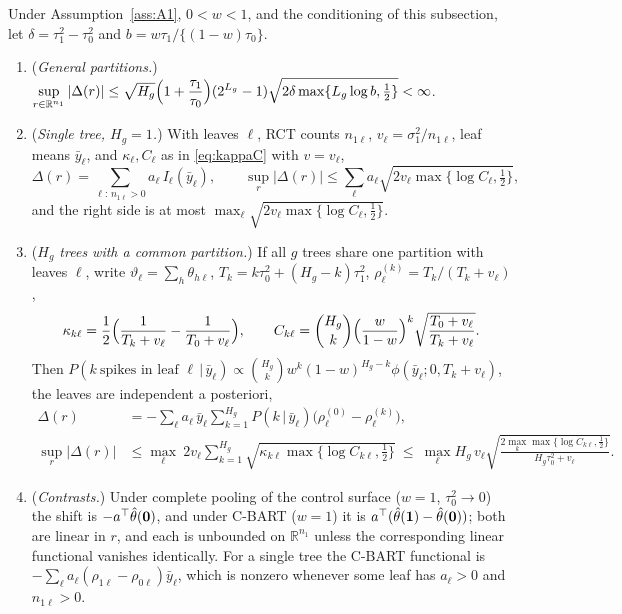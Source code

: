\documentclass[11pt]{article}
\newcommand{\given}{\,\vert\,}
\theoremstyle{definition}
\theoremstyle{plain}
\begin{document}
{\begin{corA}\label{cor:estimand}
Under Assumption~\ref{ass:A1}, $0<w<1$, and the conditioning of this subsection, let $\delta=\tau_1^2-\tau_0^2$ and $b=w\tau_1/\{(1-w)\tau_0\}$.
\begin{enumerate}[label=(\alph*),leftmargin=2.2em]
\item (\emph{General partitions.}) $\displaystyle\sup_{r\in\mathbb R^{n_1}}|\Delta(r)|\le \sqrt{H_g}\Bigl(1+\frac{\tau_1}{\tau_0}\Bigr)(2^{L_g}-1)\sqrt{2\delta\max\{L_g\log b,\tfrac12\}}<\infty$.
\item (\emph{Single tree, $H_g=1$.}) With leaves $\ell$, RCT counts $n_{1\ell}$, $v_\ell=\sigma_1^2/n_{1\ell}$, leaf means $\bar y_\ell$, and $\kappa_\ell,C_\ell$ as in \eqref{eq:kappaC} with $v=v_\ell$,
\[
\Delta(r)=\sum_{\ell:\,n_{1\ell}>0}a_\ell\,I_\ell(\bar y_\ell),\qquad
\sup_r|\Delta(r)|\le\sum_\ell a_\ell\sqrt{2v_\ell\max\{\log C_\ell,\tfrac12\}} ,
\]
and the right side is at most $\max_\ell\sqrt{2v_\ell\max\{\log C_\ell,\tfrac12\}}$.
\item (\emph{$H_g$ trees with a common partition.}) If all $g$ trees share one partition with leaves $\ell$, write $\vartheta_\ell=\sum_h\theta_{h\ell}$, $T_k=k\tau_0^2+(H_g-k)\tau_1^2$, $\rho^{(k)}_\ell=T_k/(T_k+v_\ell)$,
\[
\kappa_{k\ell}=\frac{1}{2}\Bigl(\frac{1}{T_k+v_\ell}-\frac{1}{T_0+v_\ell}\Bigr),\qquad
C_{k\ell}=\binom{H_g}{k}\Bigl(\frac{w}{1-w}\Bigr)^{k}\sqrt{\frac{T_0+v_\ell}{T_k+v_\ell}} .
\]
Then $P(k\ \text{spikes in leaf }\ell\given\bar y_\ell)\propto\binom{H_g}{k}w^k(1-w)^{H_g-k}\phi(\bar y_\ell;0,T_k+v_\ell)$, the leaves are independent a posteriori,
\begin{align}
\Delta(r)&=-\sum_\ell a_\ell\,\bar y_\ell\sum_{k=1}^{H_g}P(k\given\bar y_\ell)\bigl(\rho^{(0)}_\ell-\rho^{(k)}_\ell\bigr),
\label{eq:Delta-common}\\
\sup_r|\Delta(r)|&\le\max_\ell\ 2v_\ell\sum_{k=1}^{H_g}\sqrt{\kappa_{k\ell}\max\{\log C_{k\ell},\tfrac12\}}
\ \le\ \max_\ell H_g\,v_\ell\sqrt{\frac{2\max_k\max\{\log C_{k\ell},\tfrac12\}}{H_g\tau_0^2+v_\ell}} .
\label{eq:Delta-common-bound}
\end{align}
\item (\emph{Contrasts.}) Under complete pooling of the control surface ($w=1$, $\tau_0^2\to0$) the shift is $-a^{\top}\hat\theta(\mathbf 0)$, and under C-BART ($w=1$) it is $a^{\top}(\hat\theta(\mathbf 1)-\hat\theta(\mathbf 0))$; both are linear in $r$, and each is unbounded on $\mathbb R^{n_1}$ unless the corresponding linear functional vanishes identically. For a single tree the C-BART functional is $-\sum_\ell a_\ell(\rho_{1\ell}-\rho_{0\ell})\bar y_\ell$, which is nonzero whenever some leaf has $a_\ell>0$ and $n_{1\ell}>0$.
\end{enumerate}
\end{corA}

}
\end{document}
